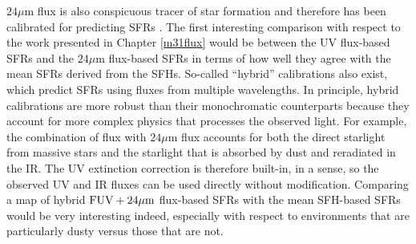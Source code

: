 $24\mu\mathrm{m}$ flux is also conspicuous tracer of star formation and
therefore has been calibrated for predicting SFRs \citep[see the review by][and
references therein]{Kennicutt:2012}. The first interesting comparison with
respect to the work presented in Chapter \ref{m31flux} would be between the UV
flux-based SFRs and the $24\mu\mathrm{m}$ flux-based SFRs in terms of how well
they agree with the mean SFRs derived from the SFHs. So-called ``hybrid''
calibrations also exist, which predict SFRs using fluxes from multiple
wavelengths. In principle, hybrid calibrations are more robust than their
monochromatic counterparts because they account for more complex physics that
processes the observed light. For example, the combination of \fuv{} flux with
$24\mu\mathrm{m}$ flux accounts for both the direct starlight from massive
stars and the starlight that is absorbed by dust and reradiated in the IR. The
UV extinction correction is therefore built-in, in a sense, so the observed UV
and IR fluxes can be used directly without modification. Comparing a map of
hybrid $\mathrm{FUV} + 24\mu\mathrm{m}$ flux-based SFRs with the mean SFH-based SFRs
would be very interesting indeed, especially with respect to environments that
are particularly dusty versus those that are not.
